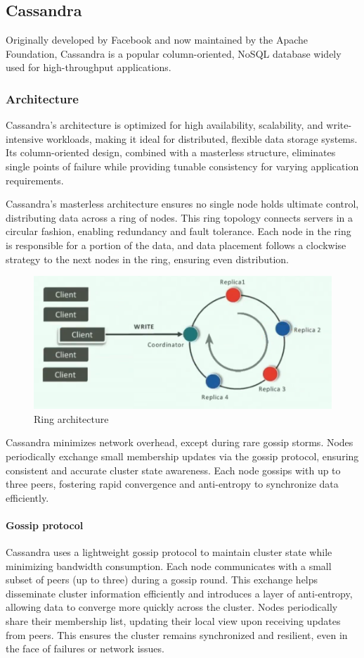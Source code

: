 \subsection{Cassandra}
Originally developed by Facebook and now maintained by the Apache Foundation, Cassandra is a popular column-oriented, NoSQL database widely used for high-throughput applications. 

\subsubsection{Architecture}
Cassandra's architecture is optimized for high availability, scalability, and write-intensive workloads, making it ideal for distributed, flexible data storage systems. 
Its column-oriented design, combined with a masterless structure, eliminates single points of failure while providing tunable consistency for varying application requirements.

Cassandra's masterless architecture ensures no single node holds ultimate control, distributing data across a ring of nodes. 
This ring topology connects servers in a circular fashion, enabling redundancy and fault tolerance.
Each node in the ring is responsible for a portion of the data, and data placement follows a clockwise strategy to the next nodes in the ring, ensuring even distribution.
\begin{figure}[H]
    \centering
    \includegraphics[width=0.65\linewidth]{images/ring.png}
    \caption{Ring architecture}
\end{figure}

Cassandra minimizes network overhead, except during rare gossip storms. 
Nodes periodically exchange small membership updates via the gossip protocol, ensuring consistent and accurate cluster state awareness.
Each node gossips with up to three peers, fostering rapid convergence and anti-entropy to synchronize data efficiently.

\paragraph*{Gossip protocol}
Cassandra uses a lightweight gossip protocol to maintain cluster state while minimizing bandwidth consumption. 
Each node communicates with a small subset of peers (up to three) during a gossip round. 
This exchange helps disseminate cluster information efficiently and introduces a layer of anti-entropy, allowing data to converge more quickly across the cluster. 
Nodes periodically share their membership list, updating their local view upon receiving updates from peers. 
This ensures the cluster remains synchronized and resilient, even in the face of failures or network issues.

